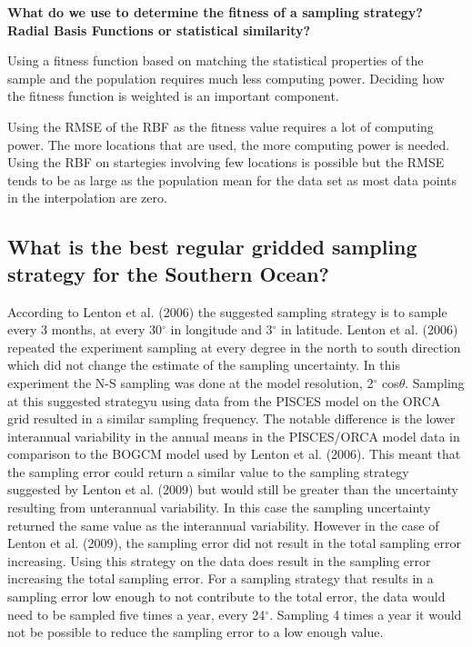 \documentclass[11pt, a4paper]{article}
\numberwithin{figure}{section}
\numberwithin{table}{section}
\begin{document}
\textbf{What do we use to determine the fitness of a sampling strategy?
Radial Basis Functions or statistical similarity?}

Using a fitness function based on matching the statistical properties of 
the sample and the population requires much less computing power. 
Deciding how the fitness function is weighted is an important component.

Using the RMSE of the RBF as the fitness value requires a lot of computing power.
The more locations that are used, the more computing power is needed. 
Using the RBF on startegies involving few locations is possible but the 
RMSE tends to be as large as the population mean for the data set as most data points
in the interpolation are zero.
	

\subsection{What is the best regular gridded sampling strategy for the Southern Ocean?}
According to Lenton et al. (2006) the suggested sampling strategy is to sample
every 3 months, at every 30$^\circ$ in longitude and 3$^\circ$ in latitude. 
Lenton et al. (2006) repeated the experiment sampling at every degree in 
the north to south direction which did not change the estimate of the sampling uncertainty.
In this experiment the N-S sampling was done at the model resolution, 2$^{\circ}$ cos$\theta$.
Sampling at this suggested strategyu using data from 
the PISCES model on the ORCA grid resulted in a similar sampling frequency. 
The notable
difference is the lower interannual variability in the annual means in the PISCES/ORCA
model data in comparison to the BOGCM model used by Lenton et al. (2006).
This meant that the sampling error could return a similar value to the sampling strategy
suggested by Lenton et al. (2009) but would still be greater than the uncertainty
resulting from unterannual variability. In this case the sampling uncertainty returned
the same value as the interannual variability. However in the case of Lenton et al. (2009), 
the sampling error did not result in the total sampling error increasing. 
Using this strategy on the data does result in the sampling error increasing the 
total sampling error.
For a sampling strategy that results in a sampling error low enough to not contribute
to the total error, the data would need to be sampled five times a year, every 24$^{\circ}$.
Sampling 4 times a year it would not be possible to reduce the sampling error to 
a low enough value.
\end{document}
